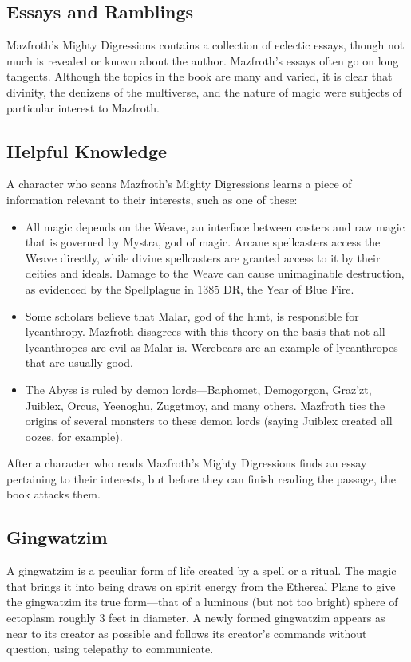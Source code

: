 \documentclass[10pt,a4paper,twoside,bg=print,twocolumn,openany,nodeprecatedcode]{dndbook}
\begin{document}
\subsection{Essays and Ramblings}
Mazfroth's Mighty Digressions contains a collection of eclectic essays, though not much is revealed or known about the author. Mazfroth's essays often go on long tangents. Although the topics in the book are many and varied, it is clear that divinity, the denizens of the multiverse, and the nature of magic were subjects of particular interest to Mazfroth.

\subsection{Helpful Knowledge}
A character who scans Mazfroth's Mighty Digressions learns a piece of information relevant to their interests, such as one of these:


\begin{itemize}
\item All magic depends on the Weave, an interface between casters and raw magic that is governed by Mystra, god of magic. Arcane spellcasters access the Weave directly, while divine spellcasters are granted access to it by their deities and ideals. Damage to the Weave can cause unimaginable destruction, as evidenced by the Spellplague in 1385 DR, the Year of Blue Fire.
\item Some scholars believe that Malar, god of the hunt, is responsible for lycanthropy. Mazfroth disagrees with this theory on the basis that not all lycanthropes are evil as Malar is. Werebears are an example of lycanthropes that are usually good.
\item The Abyss is ruled by demon lords—Baphomet, Demogorgon, Graz'zt, Juiblex, Orcus, Yeenoghu, Zuggtmoy, and many others. Mazfroth ties the origins of several monsters to these demon lords (saying Juiblex created all oozes, for example).
\end{itemize}

After a character who reads Mazfroth's Mighty Digressions finds an essay pertaining to their interests, but before they can finish reading the passage, the book attacks them.

\subsection{Gingwatzim}
A gingwatzim is a peculiar form of life created by a spell or a ritual. The magic that brings it into being draws on spirit energy from the Ethereal Plane to give the gingwatzim its true form—that of a luminous (but not too bright) sphere of ectoplasm roughly 3 feet in diameter. A newly formed gingwatzim appears as near to its creator as possible and follows its creator's commands without question, using telepathy to communicate.
\end{document}
